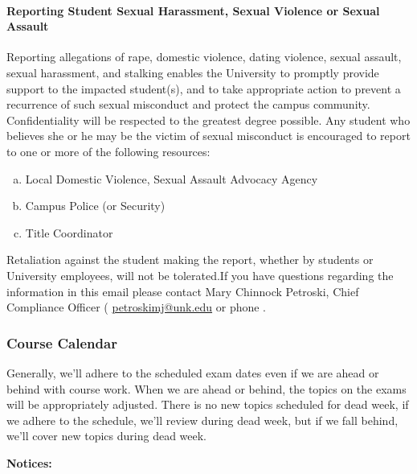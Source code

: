 \documentclass[12pt]{article}
\newcounter{ex}\setcounter{ex}{0}
\newenvironment{alphalist}{
  \begin{enumerate}[(a)]
    \addtolength{\itemsep}{-0.5\itemsep}}
  {\end{enumerate}}
\newcommand{\RomanNumeralCaps}[1]
      {\MakeUppercase{\romannumeral #1}}
\begin{document}
\paragraph{Reporting Student Sexual Harassment, Sexual Violence or Sexual Assault} Reporting allegations of rape, domestic violence, dating violence, sexual assault, sexual harassment, and stalking enables the University to promptly provide support to the impacted student(s), and to take appropriate action to prevent a recurrence of such sexual misconduct and protect the campus community. Confidentiality will be respected to the greatest degree possible. Any student who believes she or he may be the victim of sexual misconduct is encouraged to report to one or more of the following resources:
\begin{alphalist}
\item Local Domestic Violence, Sexual Assault Advocacy Agency 

\item Campus Police (or Security) 

\item Title \RomanNumeralCaps{9} Coordinator 

\end{alphalist}
Retaliation against the student making the report, whether by students or University employees, will not be tolerated.If you have questions regarding the information in this email please 
contact Mary Chinnock Petroski, Chief Compliance Officer (
   \href{mailto:petroskimj@unk.edu}{petroskimj@unk.edu} 
    or phone .

\subsubsection*{Course Calendar}

Generally, we'll adhere to the scheduled exam dates even if we are ahead or behind with course work.  When we are ahead or behind, the
topics on the exams will be appropriately adjusted.  There is no new topics scheduled for dead week, if we adhere to the schedule, we'll review during dead week, but
if we fall behind, we'll cover new topics during dead week.

\noindent \textbf{Notices:}
\end{document}
